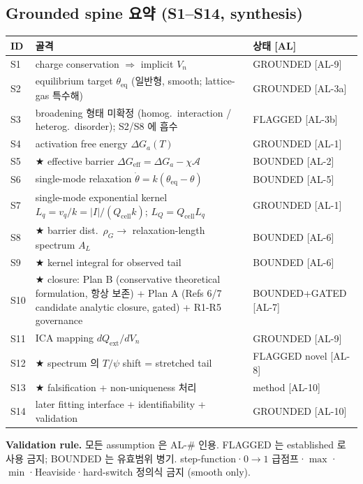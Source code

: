 \documentclass[11pt,a4paper]{article}
\newcommand{\eff}{\mathrm{eff}}
\newcommand{\eq}{\mathrm{eq}}
\newcommand{\cell}{\mathrm{cell}}
\newcommand{\ext}{\mathrm{ext}}
\newcommand{\AL}[1]{\textsf{[AL-#1]}}
\begin{document}
\subsection{Grounded spine 요약 (S1--S14, synthesis)}\label{sec:spine}
\begin{longtable}{p{} p{} p{}}
\toprule ID & 골격 & 상태 [AL] \\ \midrule \endhead
S1 & charge conservation $\Rightarrow$ implicit $V_n$ & GROUNDED \AL{9} \\
S2 & equilibrium target $\theta_\eq$ (일반형, smooth; lattice-gas 특수해) & GROUNDED \AL{3a} \\
S3 & broadening 형태 미확정 (homog.\ interaction / heterog.\ disorder); S2/S8 에 흡수 & FLAGGED \AL{3b} \\
S4 & activation free energy $\Delta G_a(T)$ & GROUNDED \AL{1} \\
S5 & ★ effective barrier $\Delta G_\eff=\Delta G_a-\chi\mathcal A$ & BOUNDED \AL{2} \\
S6 & single-mode relaxation $\dot\theta=k(\theta_\eq-\theta)$ & BOUNDED \AL{5} \\
S7 & single-mode exponential kernel $L_q=v_q/k=|I|/(Q_\cell k)$; $L_Q=Q_\cell L_q$ & GROUNDED \AL{1} \\
S8 & ★ barrier dist.\ $\rho_G\to$ relaxation-length spectrum $A_L$ & BOUNDED \AL{6} \\
S9 & ★ kernel integral for observed tail & BOUNDED \AL{6} \\
S10 & ★ closure: Plan B (conservative theoretical formulation, 항상 보존) + Plan A (Refs 6/7 candidate analytic closure, gated) + R1-R5 governance & BOUNDED+GATED \AL{7} \\
S11 & ICA mapping $dQ_\ext/dV_n$ & GROUNDED \AL{9} \\
S12 & ★ spectrum 의 $T/\psi$ shift = stretched tail & FLAGGED novel \AL{8} \\
S13 & ★ falsification + non-uniqueness 처리 & method \AL{10} \\
S14 & later fitting interface + identifiability + validation & GROUNDED \AL{10} \\
\bottomrule
\end{longtable}
\textbf{Validation rule.} 모든 assumption 은 AL-\# 인용. FLAGGED 는 established 로 사용 금지; BOUNDED
는 유효범위 병기. step-function·$0\!\to\!1$ 급점프·$\max$·$\min$·Heaviside·hard-switch
정의식 금지 (smooth only).
\end{document}
